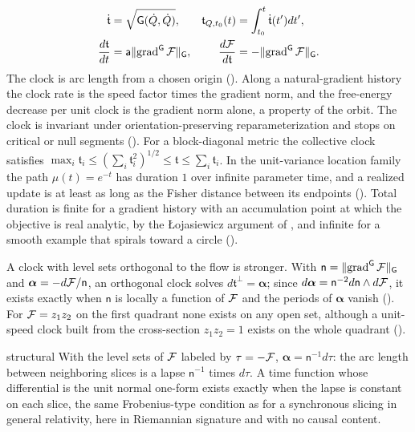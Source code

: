 \begin{align*}
\dot{\mathfrak t}&=\sqrt{\mathsf G(\dot Q,\dot Q)},
&
\mathfrak t_{Q,t_0}(t)&=\int_{t_0}^{t}\dot{\mathfrak t}(t')dt',
\\
\frac{d\mathfrak t}{dt}&=\mathsf a\lVert\operatorname{grad}^{\mathsf G}\mathcal F\rVert_{\mathsf G},
&
\frac{d\mathcal F}{d\mathfrak t}&=-\lVert\operatorname{grad}^{\mathsf G}\mathcal F\rVert_{\mathsf G}.
\end{align*}
The clock is arc length from a chosen origin (). Along a natural-gradient
history the clock rate is the speed factor times the gradient norm, and the free-energy decrease per
unit clock is the gradient norm alone, a property of the orbit. The clock is invariant under
orientation-preserving reparameterization and stops on critical or null segments
(). For a block-diagonal metric the collective clock satisfies
$\max_i\mathfrak t_i\leq(\sum_i\mathfrak t_i^2)^{1/2}\leq\mathfrak t\leq\sum_i\mathfrak t_i$. In the
unit-variance location family the path $\mu(t)=e^{-t}$ has duration $1$ over infinite parameter time,
and a realized update is at least as long as the Fisher distance between its endpoints
(). Total duration is finite for a gradient history with
an accumulation point at which the objective is real analytic, by the {\L}ojasiewicz argument of
\citet{absil2005convergence}, and infinite for a smooth example that spirals toward a circle
().

A clock with level sets orthogonal to the flow is stronger. With $\mathsf n=\lVert
\operatorname{grad}^{\mathsf G}\mathcal F\rVert_{\mathsf G}$ and $\bm\alpha=-d\mathcal F/\mathsf n$, an
orthogonal clock solves $d\mathfrak t^\perp=\bm\alpha$; since $d\bm\alpha=\mathsf n^{-2}d\mathsf n
\wedge d\mathcal F$, it exists exactly when $\mathsf n$ is locally a function of $\mathcal F$ and the
periods of $\bm\alpha$ vanish (). For $\mathcal F=z_1z_2$ on the
first quadrant none exists on any open set, although a unit-speed clock built from the cross-section
$z_1z_2=1$ exists on the whole quadrant ().

\begin{analogy}{structural}
With the level sets of $\mathcal F$ labeled by $\tau=-\mathcal F$, $\bm\alpha=\mathsf n^{-1}d\tau$: the
arc length between neighboring slices is a lapse $\mathsf n^{-1}$ times $d\tau$. A time function whose
differential is the unit normal one-form exists exactly when the lapse is constant on each slice, the
same Frobenius-type condition as for a synchronous slicing in general relativity, here in Riemannian
signature and with no causal content.
\end{analogy}

